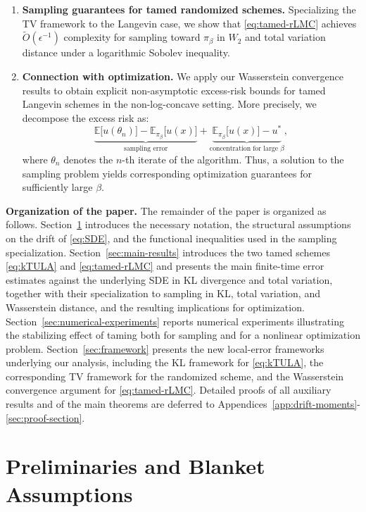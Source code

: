 \documentclass[11pt,a4paper,reqno]{amsart}
\theoremstyle{plain}
\theoremstyle{definition}
\theoremstyle{remark}
\newcommand{\E}{\mathbb{E}}
\begin{document}
\begin{enumerate}
    \item[(iv)] \textbf{Sampling guarantees for tamed randomized schemes.}
    Specializing the TV framework to the Langevin case, we show that \ref{eq:tamed-rLMC} achieves $\tilde{O}(\epsilon^{-1})$ complexity for sampling toward $\pi_\beta$ in $W_2$ and total variation distance under a logarithmic Sobolev inequality.

    \item[(v)] \textbf{Connection with optimization.}
    We apply our Wasserstein convergence results to obtain explicit non-asymptotic excess-risk bounds for tamed Langevin schemes in the non-log-concave setting. More precisely, we decompose the excess risk as:
    \[
        \underbrace{\E\!\bigl[u(\theta_n)\bigr]-\E_{\pi_\beta}\!\bigl[u(x)\bigr]}_{\text{sampling error}}
        +
        \underbrace{\E_{\pi_\beta}\!\bigl[u(x)\bigr]- u^*}_{\text{concentration for large }\beta},
    \]
    where $\theta_n$ denotes the $n$-th iterate of the algorithm. Thus, a solution to the sampling problem yields corresponding optimization guarantees for sufficiently large $\beta$.
\end{enumerate}


\medskip
\textbf{Organization of the paper.}
The remainder of the paper is organized as follows. Section~\ref{sec:preliminaries} introduces the necessary notation, the structural assumptions on the drift of \eqref{eq:SDE}, and the functional inequalities used in the sampling specialization. Section~\ref{sec:main-results} introduces the two tamed schemes \eqref{eq:kTULA} and \eqref{eq:tamed-rLMC} and presents the main finite-time error estimates against the underlying SDE in KL divergence and total variation, together with their specialization to sampling in KL, total variation, and Wasserstein distance, and the resulting implications for optimization. Section~\ref{sec:numerical-experiments} reports numerical experiments illustrating the stabilizing effect of taming both for sampling and for a nonlinear optimization problem. Section~\ref{sec:framework} presents the new local-error frameworks underlying our analysis, including the KL framework for \ref{eq:kTULA}, the corresponding TV framework for the randomized scheme, and the Wasserstein convergence argument for \ref{eq:tamed-rLMC}. Detailed proofs of all auxiliary results and of the main theorems are deferred to Appendices~\ref{app:drift-moments}-\ref{sec:proof-section}.

\section{Preliminaries and Blanket Assumptions}
\label{sec:preliminaries}
\end{document}
